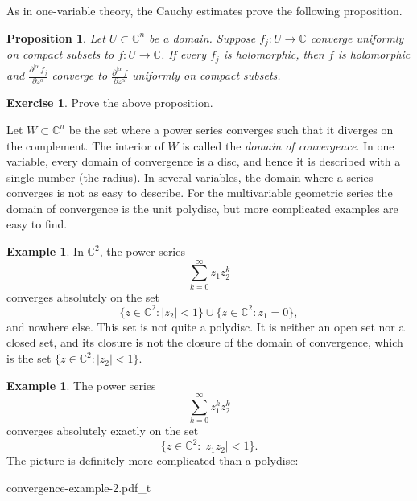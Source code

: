 \documentclass[12pt,openany]{book}
\newcommand{\sabs}[1]{\lvert {#1} \rvert}
\newcommand{\C}{{\mathbb{C}}}
\newcommand{\myindex}[1]{#1\index{#1}}
\theoremstyle{plain}
\newtheorem{prop}[thm]{Proposition}
\theoremstyle{remark}
\theoremstyle{definition}
\newenvironment{exbox}{%
    \def\FrameCommand{\vrule width 1pt \relax\hspace {10pt}}%
    \MakeFramed {\advance \hsize -\width \FrameRestore }%
}{%
    \endMakeFramed
}
\theoremstyle{exercise}
\newtheorem{exercise}{Exercise}[section]
\theoremstyle{example}
\newtheorem{example}[thm]{Example}
\begin{document}
As in one-variable theory, the Cauchy estimates prove the following
proposition.

\begin{prop}
Let $U \subset \C^n$ be a domain.
Suppose $f_j \colon U \to \C$ converge uniformly on compact subsets
to $f \colon U \to \C$.  If every $f_j$ is holomorphic, then $f$ is
holomorphic and 
$\frac{\partial^{\sabs{\alpha}} f_j}{\partial z^\alpha}$ converge to
$\frac{\partial^{\sabs{\alpha}} f}{\partial z^\alpha}$ uniformly on compact
subsets.
\end{prop}

\begin{exbox}
\begin{exercise}
Prove the above proposition.
\end{exercise}
\end{exbox}

Let $W \subset \C^n$ be the set where a power series converges
such that it diverges on the complement.  The interior of $W$
is called the
\emph{\myindex{domain of convergence}}.
In one variable, every domain of convergence is a disc, and hence it is
described with a single number (the radius).
In several variables, the domain where a series
converges is not as easy to describe.
For the multivariable geometric series 
the domain of convergence is the unit polydisc, but more
complicated examples are easy to find.

\begin{example}
In $\C^2$, the power series
\begin{equation*}
\sum_{k=0}^\infty z_1 z_2^k
\end{equation*}
converges absolutely on the set
\begin{equation*}
\bigl\{ z \in \C^2 : \sabs{z_2} < 1 \bigr\}
\cup
\bigl\{ z \in \C^2 : z_1 = 0 \bigr\} ,
\end{equation*}
and nowhere else.
This set is not quite a polydisc.  It is neither an open set nor a closed set,
and its closure is not the closure of the domain of convergence,
which is the set $\bigl\{ z \in \C^2 : \sabs{z_2} < 1 \bigr\}$.
\end{example}

\begin{example}
The power series
\begin{equation*}
\sum_{k=0}^\infty z_1^k z_2^k
\end{equation*}
converges absolutely exactly on the set
\begin{equation*}
\bigl\{ z \in \C^2 : \sabs{z_1 z_2} < 1 \bigr\} .
\end{equation*}
The picture is definitely more complicated than a polydisc:

\medskip

\begin{center}
{convergence-example-2.pdf_t}
\end{center}
\end{example}
\end{document}
